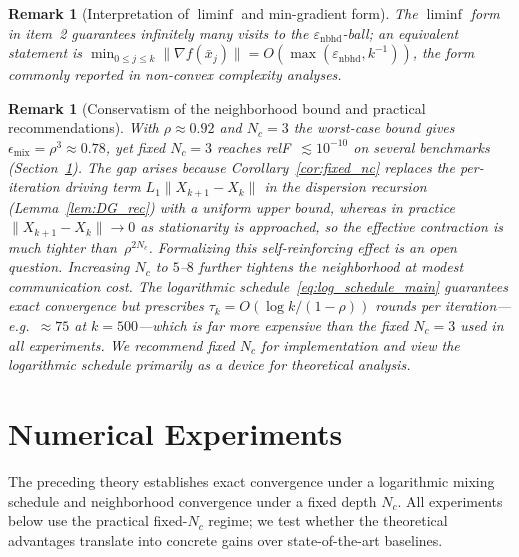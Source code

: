 \documentclass[11pt,a4paper]{article}
\def\cO{O}%
\newtheorem{remark}[theorem]{Remark}
\newcommand{\cO}{\mathcal{O}}
\begin{document}
\begin{remark}[Interpretation of $\liminf$ and min-gradient form]
The $\liminf$ form in item~2 guarantees infinitely many visits to
the $\varepsilon_{\mathrm{nbhd}}$-ball; an equivalent statement is
$\min_{0\le j\le k}\|\nabla f(\bar x_j)\|
=\cO(\max(\varepsilon_{\mathrm{nbhd}}, k^{-1}))$,
the form commonly reported in non-convex complexity analyses.
\end{remark}

\begin{remark}[Conservatism of the neighborhood bound and practical recommendations]\label{rem:practical_implications}
With $\rho\approx 0.92$ and $N_c=3$ the worst-case bound gives
$\epsilon_{\mathrm{mix}}=\rho^3\approx 0.78$, yet fixed $N_c{=}3$
reaches relF~$\lesssim 10^{-10}$ on several benchmarks
(Section~\ref{sec:experiments}).
The gap arises because Corollary~\ref{cor:fixed_nc} replaces the
per-iteration driving term $L_1\|X_{k+1}{-}X_k\|$ in the
dispersion recursion (Lemma~\ref{lem:DG_rec}) with a \emph{uniform}
upper bound, whereas in practice
$\|X_{k+1}{-}X_k\|\to 0$ as stationarity is approached, so the
effective contraction is much tighter than~$\rho^{2N_c}$.
Formalizing this self-reinforcing effect is an open question.
Increasing $N_c$ to $5$--$8$ further tightens the neighborhood at
modest communication cost.
The logarithmic schedule~\eqref{eq:log_schedule_main} guarantees
exact convergence but prescribes $\tau_k=\cO(\log k/(1{-}\rho))$
rounds per iteration---e.g.\ ${\approx}75$ at $k{=}500$---which is
far more expensive than the fixed $N_c{=}3$ used in all experiments.
We recommend fixed $N_c$ for implementation and view the
logarithmic schedule primarily as a device for theoretical analysis.
\end{remark}




\section{Numerical Experiments}\label{sec:experiments}
	
	The preceding theory establishes exact convergence under a
	logarithmic mixing schedule and neighborhood convergence under
	a fixed depth $N_c$.
	All experiments below use the practical fixed-$N_c$ regime;
	we test whether the theoretical advantages translate
	into concrete gains over state-of-the-art baselines.
	
\end{document}
